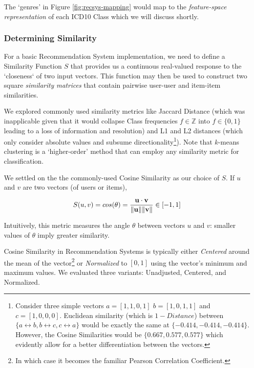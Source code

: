 \documentclass[twoside,11pt]{article}
\begin{document}
The `genres' in Figure \ref{fig:recsys-mapping} would map to the \textit{feature-space representation} of each ICD10 Class which we will discuss shortly.


\subsubsection{Determining Similarity} \label{section:similarity}

For a basic Recommendation System implementation, we need to define a Similarity Function $S$ that provides us a continuous real-valued response to the `closeness` of two input vectors. This function may then be used to construct two square \textit{similarity matrices} that contain pairwise user-user and item-item similarities.

We explored commonly used similarity metrics like Jaccard Distance (which was inapplicable given that it would collapse Class frequencies $f\in\mathbb{Z}$ into $f\in\{0,1\}$ leading to a loss of information and resolution) and L1 and L2 distances (which only consider absolute values and subsume directionality\footnote{Consider three simple vectors $a = [1,1,0,1]$ $b = [1,0,1,1]$ and $c = [1,0,0,0]$. Euclidean similarity (which is $1 - Distance$) between $\{a \leftrightarrow b, b \leftrightarrow c, c \leftrightarrow a\}$ would be exactly the same at $\{-0.414, -0.414, -0.414\}$. However, the Cosine Similarities would be $\{0.667, 0.577, 0.577\}$ which evidently allow for a better differentiation between the vectors.}). Note that $k$-means clustering is a `higher-order' method that can employ any similarity metric for classification.

We settled on the the commonly-used Cosine Similarity as our choice of $S$. If $u$ and $v$ are two vectors (of users or items),

\begin{equation}
  S(u, v) = cos(\theta) = {\mathbf{u} \cdot \mathbf{v} \over \|\mathbf{u}\| \|\mathbf{v}\|} \in [-1, 1]
  \label{eq:similarity-cosine}
\end{equation}

Intuitively, this metric measures the angle $\theta$ between vectors $u$ and $v$: smaller values of $\theta$ imply greater similarity.

Cosine Similarity in Recommendation Systems is typically either \textit{Centered} around the mean of the vector\footnote{In which case it becomes the familiar Pearson Correlation Coefficient.} or \textit{Normalized} to $[0,1]$ using the vector's minimum and maximum values. We evaluated three variants: Unadjusted, Centered, and Normalized.
\end{document}
